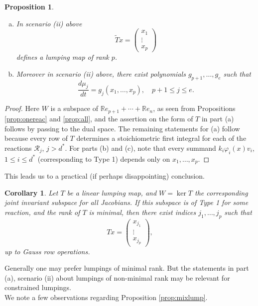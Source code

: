 \documentclass{article}
\newtheorem{corollary}{Corollary}
\newtheorem{proposition}{Proposition}
\begin{document}
\begin{proposition}
\begin{enumerate}[(a)]
\begin{enumerate}[(i)]
\[\]
and furthermore all $\mu_j(v_{\ell})=0$, $p+1\leq j\leq e,\, \ell>d^*$. Thus $x_1,\ldots,x_p,\,\mu_{p+1},\ldots,\mu_e$ are first integrals for every reaction that corresponds to a Type 2 subspace. Conversely the conditions on the $\mu_i$ are sufficient for a lumping map.
\end{enumerate}
\item In scenario (ii) above
\[
\widetilde Tx=\begin{pmatrix}x_1\\ \vdots\\ x_p\end{pmatrix}
\]
defines a lumping map of rank $p$.
\item Moreover in scenario (ii) above, there exist polynomials $g_{p+1},\ldots,g_e$ such that
\[
\frac{d\mu_j}{dt}= g_j(x_1,\ldots,x_p),\quad p+1\leq j\leq e.
\]
\end{enumerate}
\end{proposition}
\begin{proof}
Here $W$ is a subspace of $\mathbb R e_{p+1}+\cdots+\mathbb R e_n$, as seen from Propositions \ref{prop:onereac} and \ref{prop:all}, and the assertion on the form of $T$ in part (a) follows by passing to the dual space. The remaining statements for (a) follow because every row of $T$ determines a stoichiometric first integral for each of the reactions $\mathcal R_j$, $j>d^*$. For parts (b) and (c), note that every summand $k_i\varphi_i(x)v_i$, $1\leq i\leq d^*$ (corresponding to Type 1) depends only on $x_1,\ldots,x_p$.
\end{proof}
 This leads us to a practical (if perhaps disappointing) conclusion.
\begin{corollary}\label{cor:mixlump}
    Let $T$ be a linear lumping map, and $W=\ker T$ the corresponding joint invariant subspace for all Jacobians. If this subspace is of Type 1 for some reaction, and the rank of $T$ is minimal, then there exist indices $j_1,\ldots,j_p$ such that 
    \[
Tx=\begin{pmatrix} x_{j_1}\\  \vdots\\ x_{j_p}\end{pmatrix},
\]
up to Gauss row operations.
\end{corollary}
    Generally one may prefer lumpings of minimal rank. But the statements in part (a), scenario (ii) about lumpings of non-minimal rank may be relevant for constrained lumpings.\\
    We note a few observations regarding Proposition \ref{prop:mixlump}.
\end{document}
